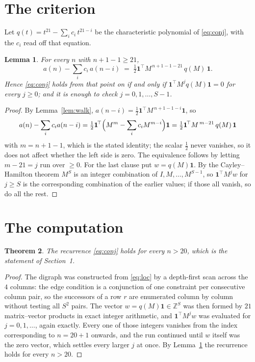 \documentclass[11pt,a4paper]{article}
\theoremstyle{plain}
\newtheorem{theorem}{Theorem}
\newtheorem{lemma}[theorem]{Lemma}
\theoremstyle{definition}
\begin{document}
\section{The criterion}

Let $q(t)=t^{21}-\sum_i c_i\,t^{21-i}$ be the characteristic polynomial of
\eqref{eq:conj}, with the $c_i$ read off that equation.

\begin{lemma}\label{lem:crit}
For every $n$ with $n+1-1\ge21$,
\[
a(n)-\sum_i c_i\,a(n-i)\;=\;\tfrac1{2}\mathbf{1}^{\!\top}M^{\,n+1-1-21}\,q(M)\,\mathbf{1} .
\]
Hence \eqref{eq:conj} holds from that point on if and only if
$\mathbf{1}^{\!\top}M^{j}q(M)\mathbf{1}=0$ for every $j\ge0$; and it is enough to check
$j=0,1,\dots,S-1$.
\end{lemma}

\begin{proof}
By Lemma~\ref{lem:walk}, $a(n-i)=\tfrac1{2}\mathbf{1}^{\!\top}M^{\,n+1-1-i}\mathbf{1}$, so
\[
a(n)-\sum_i c_i a(n-i)
=\tfrac1{2}\mathbf{1}^{\!\top}\Bigl(M^{m}-\sum_i c_i M^{m-i}\Bigr)\mathbf{1}
=\tfrac1{2}\mathbf{1}^{\!\top}M^{\,m-21}\,q(M)\,\mathbf{1}
\]
with $m=n+1-1$, which is the stated identity; the scalar $\tfrac1{2}$ never vanishes, so
it does not affect whether the left side is zero. The equivalence follows by letting
$m-21=j$ run over $\ge0$. For the last clause put $w=q(M)\mathbf{1}$. By the
Cayley--Hamilton theorem $M^{S}$ is an integer combination of $I,M,\dots,M^{S-1}$, so
$\mathbf{1}^{\!\top}M^{j}w$ for $j\ge S$ is the corresponding combination of the earlier
values; if those all vanish, so do all the rest.
\end{proof}

\section{The computation}

\begin{theorem}
The recurrence \eqref{eq:conj} holds for every $n>20$, which is the statement of
Section~1.
\end{theorem}

\begin{proof}
The digraph was constructed from \eqref{eq:loc} by a depth-first scan across the $4$
columns: the edge condition is a conjunction of one constraint per consecutive column
pair, so the successors of a row $r$ are enumerated column by column without testing all
$S^2$ pairs. The vector $w=q(M)\mathbf{1}\in\mathbb{Z}^{S}$ was then formed by $21$
matrix--vector products in exact integer arithmetic, and $\mathbf{1}^{\!\top}M^{j}w$ was
evaluated for $j=0,1,\dots$, again exactly. Every one of those integers vanishes from the
index corresponding to $n=20+1$ onwards, and the run continued until $w$ itself was the
zero vector, which settles every larger $j$ at once. By Lemma~\ref{lem:crit} the recurrence
holds for every $n>20$.
\end{proof}
\end{document}
